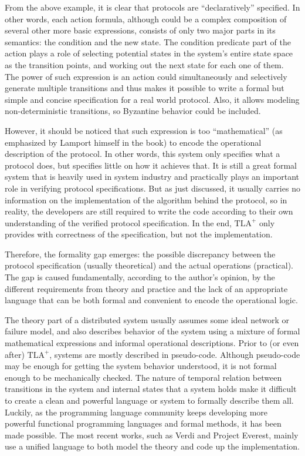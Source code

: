 \documentclass[twocolumn]{article}
\begin{document}
From the above example, it is clear that protocols are ``declaratively''
specified. In other words, each action formula, although could be a complex
composition of several other more basic expressions, consists of only two major
parts in its semantics: the condition and the new state. The condition
predicate part of the action plays a role of selecting potential states in the
system's entire state space as the transition points, and working out the next
state for each one of them. The power of such expression is an action could
simultaneously and selectively generate multiple transitions and thus makes it
possible to write a formal but simple and concise specification for a real
world protocol. Also, it allows modeling non-deterministic transitions, so
Byzantine behavior could be included.

However, it should be noticed that such expression is too ``mathematical'' (as
emphasized by Lamport himself in the book) to encode the operational
description of the protocol. In other words, this system only specifies what a
protocol does, but specifies little on how it achieves that. It is still a
great formal system that is heavily used in system industry and practically
plays an important role in verifying protocol specifications.  But as just
discussed, it usually carries no information on the implementation of the
algorithm behind the protocol, so in reality, the developers are still required
to write the code according to their own understanding of the verified protocol
specification. In the end, $\textrm{TLA}^+$ only provides with correctness of
the specification, but not the implementation.

Therefore, the formality gap emerges: the possible discrepancy between the
protocol specification (usually theoretical) and the actual operations (practical).
The gap is caused fundamentally, according to the author's opinion, by the
different requirements from theory and practice and the lack of an appropriate
language that can be both formal and convenient to encode the
operational logic.

The theory part of a distributed system usually assumes some ideal network or
failure model, and also describes behavior of the system using a mixture of
formal mathematical expressions and informal operational descriptions.  Prior
to  (or even after) $\textrm{TLA}^+$, systems are mostly described in
pseudo-code. Although pseudo-code may be enough for getting the system behavior
understood, it is not formal enough to be mechanically checked. The nature of
temporal relation between transitions in the system and internal states that a
system holds make it difficult to create a clean and powerful language or
system to formally describe them all. Luckily, as the programming language community
keeps developing more powerful functional programming languages and formal methods, it
has been made possible. The most recent works, such as Verdi and Project
Everest, mainly use a unified language to both model the theory and
code up the implementation.
\end{document}
